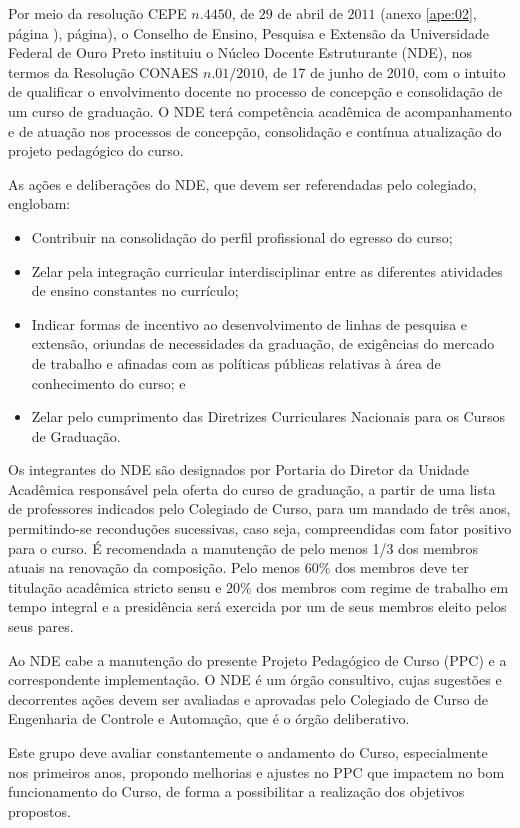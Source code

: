 Por meio da resolução CEPE $n. 4450$, de $29$ de abril de $2011$ (anexo \ref{ape:02}, página \pageref{cepe4450}), página), o Conselho de Ensino, Pesquisa e Extensão da Universidade Federal de Ouro Preto instituiu o Núcleo Docente Estruturante (NDE), nos termos da Resolução CONAES $n. 01/2010$, de 17 de junho de 2010, com o intuito de qualificar o envolvimento docente no processo de concepção e consolidação de um curso de graduação. O NDE terá competência acadêmica de acompanhamento e de atuação nos processos de concepção, consolidação e contínua atualização do projeto pedagógico do curso. 

As ações e deliberações do NDE, que devem ser referendadas pelo colegiado, englobam:
\begin{itemize}
	\item Contribuir na consolidação do perfil profissional do egresso do curso; 
	\item Zelar pela integração curricular interdisciplinar entre as diferentes atividades de ensino constantes no currículo; 
	\item Indicar formas de incentivo ao desenvolvimento de linhas de pesquisa e extensão, oriundas de necessidades da graduação, de exigências do mercado de trabalho e afinadas com as políticas públicas relativas à área de conhecimento do curso; e
	\item Zelar pelo cumprimento das Diretrizes Curriculares Nacionais para os Cursos de Graduação.
\end{itemize}

Os integrantes do NDE são designados por Portaria do Diretor da Unidade Acadêmica responsável pela oferta do curso de graduação, a partir de uma lista de professores indicados pelo Colegiado de Curso, para um mandado de três anos, permitindo-se reconduções sucessivas, caso seja, compreendidas com fator positivo para o curso. É recomendada a manutenção de pelo menos 1/3 dos membros atuais na renovação da composição. Pelo menos $60\%$ dos membros deve ter titulação acadêmica stricto sensu e $20 \%$ dos membros com regime de trabalho em tempo integral e a presidência será exercida por um de seus membros eleito pelos seus pares.

Ao NDE cabe a manutenção do presente Projeto Pedagógico de Curso (PPC) e a correspondente implementação. O NDE é um órgão consultivo, cujas sugestões e decorrentes ações devem ser avaliadas e aprovadas pelo Colegiado de Curso de Engenharia de Controle e Automação, que é o órgão deliberativo. 

Este grupo deve avaliar constantemente o andamento do Curso, especialmente nos primeiros anos, propondo melhorias e ajustes no PPC que impactem no bom funcionamento do Curso, de forma a possibilitar a realização dos objetivos propostos.

